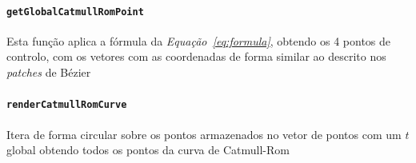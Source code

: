 \paragraph{\texttt{getGlobalCatmullRomPoint}}

Esta função aplica a fórmula da \emph{Equação~\ref{eq:formula}}, obtendo os
4 pontos de controlo, com os vetores com as coordenadas de forma similar ao
descrito nos \emph{patches} de Bézier  

\paragraph{\texttt{renderCatmullRomCurve}}

Itera de forma circular sobre os pontos armazenados no vetor de pontos com um
$t$ global obtendo todos os pontos da curva de Catmull-Rom




